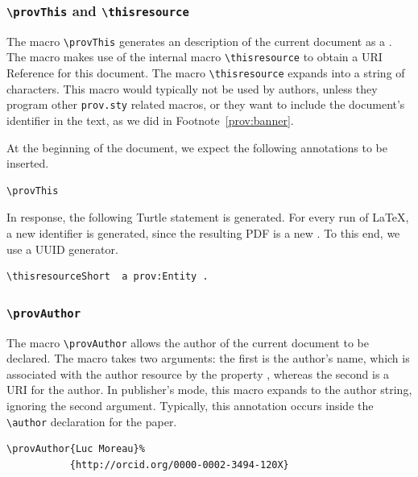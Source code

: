 \documentclass{sigplanconf}
\newcommand{\provstyMacro}[1]{{\tt \textbackslash prov{#1}}\xspace}
\newcommand{\latexMacro}[1]{{\tt \textbackslash#1}\xspace}
\newcommand{\provsty}{{\tt prov.sty}\xspace}
\begin{document}
\subsubsection{\provstyMacro{This} and \latexMacro{thisresource}}\label{this:macro}

The macro \provstyMacro{This} generates an \RDF description of the
current document as a .  The macro makes use of the
internal macro \latexMacro{thisresource} to obtain a URI Reference for
this document. The macro \latexMacro{thisresource} expands into a
string of characters. This macro would typically not be used by
authors, unless they program other \provsty related macros, or they
want to include the document's identifier in the text, as we did in
Footnote~\ref{prov:banner}.

At the beginning of the document, we expect the following annotations
to be inserted.

{\footnotesize
\begin{Verbatim}
\provThis
\end{Verbatim}
}

In response, the following Turtle statement is generated. For every
run of \LaTeX, a new identifier is generated, since the resulting PDF
is a new . To this end, we use a UUID generator.

{\footnotesize
\begin{Verbatim}[commandchars=\\\{\}]
\thisresourceShort  a prov:Entity .
\end{Verbatim}
}


\subsubsection{\provstyMacro{Author}}\label{author:macro}

The macro  \provstyMacro{Author} allows the author of the current document to be declared.
The macro takes two arguments: the first is the author's name, which
is associated with the author resource by the property ,
whereas the second is a URI for the author.  In publisher's mode, this
macro expands to the author string, ignoring the second
argument. Typically, this annotation occurs inside the
\latexMacro{author} declaration for the paper.

{\footnotesize
\begin{Verbatim}
\provAuthor{Luc Moreau}%
           {http://orcid.org/0000-0002-3494-120X}
\end{Verbatim}
}
\end{document}
